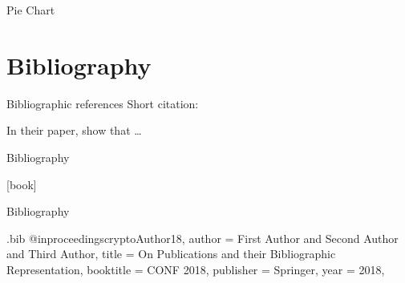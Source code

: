 \documentclass[table, aspectratio=169]{beamer}
\begin{document}
\begin{frame}{Pie Chart}
  \centering
\end{frame}

\section{Bibliography}

\begin{frame}{Bibliographic references}
  Short citation: \cite{cryptoAuthor18}

  In their paper, \textcite{cryptoAuthor18} show that \dots %
\end{frame}

\begin{frame}[allowframebreaks]{Bibliography}
  \printbibliography
\end{frame}

[book]
\begin{frame}[allowframebreaks]{Bibliography}
  \printbibliography
\end{frame}

\begin{filecontents*}{\jobname.bib}
@inproceedings{cryptoAuthor18,
  author       = {First Author and
                  Second Author and
                  Third Author},
  title        = {On Publications and their Bibliographic Representation},
  booktitle    = {CONF 2018},
  publisher    = {Springer},
  year         = {2018},
}
\end{filecontents*}
\end{document}
